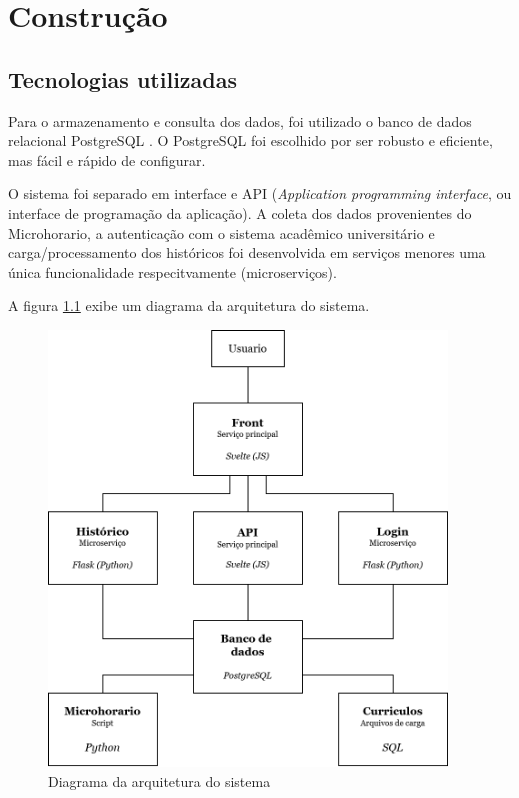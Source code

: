 \chapter{Construção}
\label{cha:Construção}

\section{Tecnologias utilizadas}

Para o armazenamento e consulta dos dados, foi utilizado o banco de dados relacional PostgreSQL \cite{site-postgresql}. O PostgreSQL foi escolhido por ser robusto e eficiente, mas fácil e rápido de configurar. 

O sistema foi separado em interface e API (\textit{Application programming interface}, ou interface de programação da aplicação). A coleta dos dados provenientes do Microhorario, a autenticação com o sistema acadêmico universitário e carga/processamento dos históricos foi desenvolvida em serviços menores uma única funcionalidade respecitvamente (microserviços). 

A figura \ref{fig:diagrama-arquitetura} exibe um diagrama da arquitetura do sistema.

\begin{figure}[ht]
    \begin{center}
    \includegraphics[width=300pt]{figuras/diagrama-arquitetura.png}
    \caption{Diagrama da arquitetura do sistema}
    \label{fig:diagrama-arquitetura}
    \end{center}
\end{figure}

